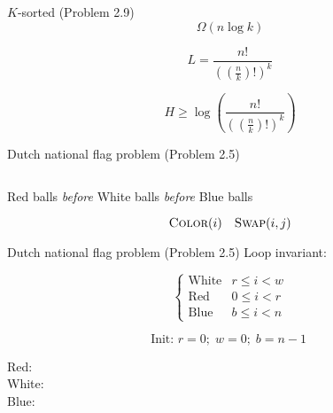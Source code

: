 \begin{frame}{$K$-sorted (Problem 2.9)}
  \[
    \Omega(n \log k)
  \]

  \pause
  \[
	L = \frac{n!}{\left( (\frac{n}{k})! \right)^{k}}
  \]

  \pause
  \[
	H \ge \log \left(\frac{n!}{\left( (\frac{n}{k})! \right)^{k}} \right)
  \]
\end{frame}
\begin{frame}{Dutch national flag problem (Problem 2.5)}
  \begin{columns}
  \end{columns}

  \vspace{0.50cm}
  \centerline{Red balls \emph{before} White balls \emph{before} Blue balls}

  \pause
  \[
	\textsc{Color}(i) \quad \textsc{Swap}(i,j)
  \]
\end{frame}
\begin{frame}{Dutch national flag problem (Problem 2.5)}
  Loop invariant:

  \begin{equation*}
	\begin{cases}
	  \text{White} & r \le i < w \\
	  \text{Red} & 0 \le i < r \\
	  \text{Blue} & b \le i < n
	\end{cases}
  \end{equation*}

  \pause
  \[
	\text{Init: } r = 0; \; w = 0; \; b = n - 1\;
  \]

  \vspace{0.30cm}
  \begin{description}
	\item[Red:] 
	\item[White:] 
	\item[Blue:] 
  \end{description}
\end{frame}

